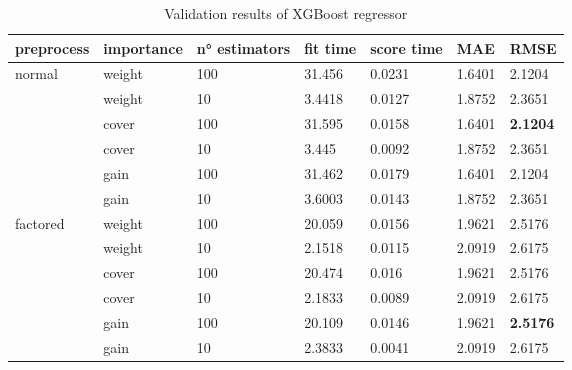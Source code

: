 \begin{table}[H]
    \centering
    \begin{tabular}{lll|llll}
    \toprule
    \textbf{preprocess} & \textbf{importance} & \textbf{n° estimators} & \textbf{fit time} & \textbf{score time} & \textbf{MAE} & \textbf{RMSE} \\ \midrule
    \multirow{6}{*}{normal}     & weight & 100 & 31.456 & 0.0231 & 1.6401 & 2.1204 \\
                                & weight & 10  & 3.4418 & 0.0127 & 1.8752 & 2.3651 \\
                                & cover  & 100 & 31.595 & 0.0158 & 1.6401 & \textbf{2.1204} \\
                                & cover  & 10  & 3.445  & 0.0092 & 1.8752 & 2.3651 \\
                                & gain   & 100 & 31.462 & 0.0179 & 1.6401 & 2.1204 \\
                                & gain   & 10  & 3.6003 & 0.0143 & 1.8752 & 2.3651 \\
                                \midrule
    \multirow{6}{*}{factored}   & weight & 100 & 20.059 & 0.0156 & 1.9621 & 2.5176 \\
                                & weight & 10  & 2.1518 & 0.0115 & 2.0919 & 2.6175 \\
                                & cover  & 100 & 20.474 & 0.016  & 1.9621 & 2.5176 \\
                                & cover  & 10  & 2.1833 & 0.0089 & 2.0919 & 2.6175 \\
                                & gain   & 100 & 20.109 & 0.0146 & 1.9621 & \textbf{2.5176} \\
                                & gain   & 10  & 2.3833 & 0.0041 & 2.0919 & 2.6175 \\
    \bottomrule
    \end{tabular}
    \caption{Validation results of XGBoost regressor}
    \label{tab:val_xgb}
    \end{table}
